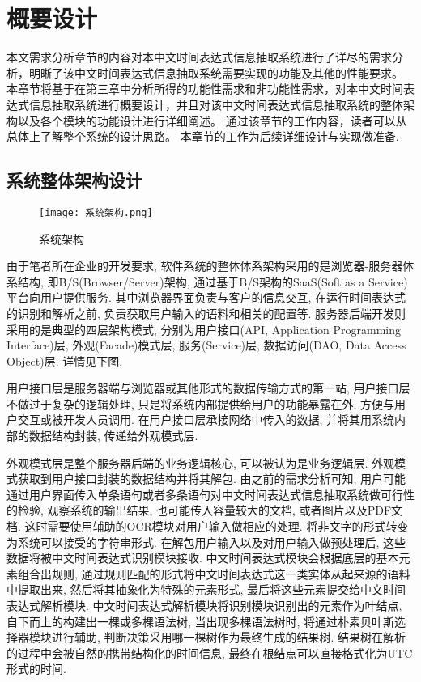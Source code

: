 

\chapter{概要设计}

本文需求分析章节的内容对本中文时间表达式信息抽取系统进行了详尽的需求分析，明晰了该中文时间表达式信息抽取系统需要实现的功能及其他的性能要求。
本章节将基于在第三章中分析所得的功能性需求和非功能性需求，对本中文时间表达式信息抽取系统进行概要设计，并且对该中文时间表达式信息抽取系统的整体架构以及各个模块的功能设计进行详细阐述。
通过该章节的工作内容，读者可以从总体上了解整个系统的设计思路。
本章节的工作为后续详细设计与实现做准备.

\section{系统整体架构设计}

\begin{figure}[h]
  \centering
  \texttt{[image: 系统架构.png]}
  \caption{系统架构}
  \label{fig:badge}
\end{figure}

由于笔者所在企业的开发要求, 软件系统的整体体系架构采用的是浏览器-服务器体系结构, 即B/S(Browser/Server)架构, 通过基于B/S架构的SaaS(Soft as a Service)平台向用户提供服务.
其中浏览器界面负责与客户的信息交互, 在运行时间表达式的识别和解析之前, 负责获取用户输入的语料和相关的配置等.
服务器后端开发则采用的是典型的四层架构模式, 分别为用户接口(API, Application Programming Interface)层, 外观(Facade)模式层, 服务(Service)层, 数据访问(DAO, Data Access Object)层. 详情见下图.

用户接口层是服务器端与浏览器或其他形式的数据传输方式的第一站, 用户接口层不做过于复杂的逻辑处理, 只是将系统内部提供给用户的功能暴露在外, 方便与用户交互或被开发人员调用.
在用户接口层承接网络中传入的数据, 并将其用系统内部的数据结构封装, 传递给外观模式层.

外观模式层是整个服务器后端的业务逻辑核心, 可以被认为是业务逻辑层. 外观模式获取到用户接口封装的数据结构并将其解包.
由之前的需求分析可知, 用户可能通过用户界面传入单条语句或者多条语句对中文时间表达式信息抽取系统做可行性的检验, 观察系统的输出结果,
也可能传入容量较大的文档, 或者图片以及PDF文档. 这时需要使用辅助的OCR模块对用户输入做相应的处理. 将非文字的形式转变为系统可以接受的字符串形式.
在解包用户输入以及对用户输入做预处理后, 这些数据将被中文时间表达式识别模块接收.
中文时间表达式模块会根据底层的基本元素组合出规则, 通过规则匹配的形式将中文时间表达式这一类实体从起来源的语料中提取出来, 然后将其抽象化为特殊的元素形式, 最后将这些元素提交给中文时间表达式解析模块.
中文时间表达式解析模块将识别模块识别出的元素作为叶结点, 自下而上的构建出一棵或多棵语法树, 当出现多棵语法树时, 将通过朴素贝叶斯选择器模块进行辅助, 判断决策采用哪一棵树作为最终生成的结果树.
结果树在解析的过程中会被自然的携带结构化的时间信息, 最终在根结点可以直接格式化为UTC形式的时间.

